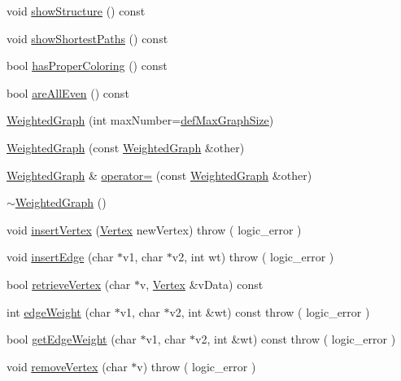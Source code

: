\begin{DoxyCompactItemize}
void \hyperlink{class_weighted_graph_ad7f20a989073ea5401d504d944182347}{show\-Structure} () const 
\item 
void \hyperlink{class_weighted_graph_a91740718926ca2862726d297e7b28b7f}{show\-Shortest\-Paths} () const 
\item 
bool \hyperlink{class_weighted_graph_a60be8bab10a9142846093cb768855efd}{has\-Proper\-Coloring} () const 
\item 
bool \hyperlink{class_weighted_graph_a03884e32b9e093b10e3a44add7eaa928}{are\-All\-Even} () const 
\item 
\hyperlink{class_weighted_graph_acf8f5b4f212bc8daf4b12f0b88899180}{Weighted\-Graph} (int max\-Number=\hyperlink{_weighted_graph3_8h_a5a62135a2c33201a5b5d22eda348cbcb}{def\-Max\-Graph\-Size})
\item 
\hyperlink{class_weighted_graph_a294fd717db213e761dc0eb65bbfcb7ab}{Weighted\-Graph} (const \hyperlink{class_weighted_graph}{Weighted\-Graph} \&other)
\item 
\hyperlink{class_weighted_graph}{Weighted\-Graph} \& \hyperlink{class_weighted_graph_a32c3057c0f746f427068be4a9b408845}{operator=} (const \hyperlink{class_weighted_graph}{Weighted\-Graph} \&other)
\item 
\hyperlink{class_weighted_graph_ad7b4a5c8206772f9f4fb5906c0d64923}{$\sim$\-Weighted\-Graph} ()
\item 
void \hyperlink{class_weighted_graph_a164845f6fecf25a25f5f14f69d42d975}{insert\-Vertex} (\hyperlink{class_weighted_graph_1_1_vertex}{Vertex} new\-Vertex)  throw ( logic\-\_\-error )
\item 
void \hyperlink{class_weighted_graph_ad5e4bb96c2b3b5ace4be251bb3b47621}{insert\-Edge} (char $\ast$v1, char $\ast$v2, int wt)  throw ( logic\-\_\-error )
\item 
bool \hyperlink{class_weighted_graph_add447f0f2354c8c776045bf3bec865d8}{retrieve\-Vertex} (char $\ast$v, \hyperlink{class_weighted_graph_1_1_vertex}{Vertex} \&v\-Data) const 
\item 
int \hyperlink{class_weighted_graph_a80b2b095e7a05df4841383d2067e4345}{edge\-Weight} (char $\ast$v1, char $\ast$v2, int \&wt) const   throw ( logic\-\_\-error )
\item 
bool \hyperlink{class_weighted_graph_a0ff5197e169472040ab88b81049340d9}{get\-Edge\-Weight} (char $\ast$v1, char $\ast$v2, int \&wt) const   throw ( logic\-\_\-error )
\item 
void \hyperlink{class_weighted_graph_a0eb59d893befdedcda67add1466b9fdd}{remove\-Vertex} (char $\ast$v)  throw ( logic\-\_\-error )

\end{DoxyCompactItemize}
